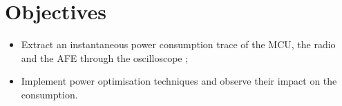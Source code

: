 \section*{Objectives}

\begin{itemize}
    \item Extract an instantaneous power consumption trace of the MCU, the radio and the AFE through the oscilloscope ;
    \item Implement power optimisation techniques and observe their impact on the consumption.
\end{itemize}
